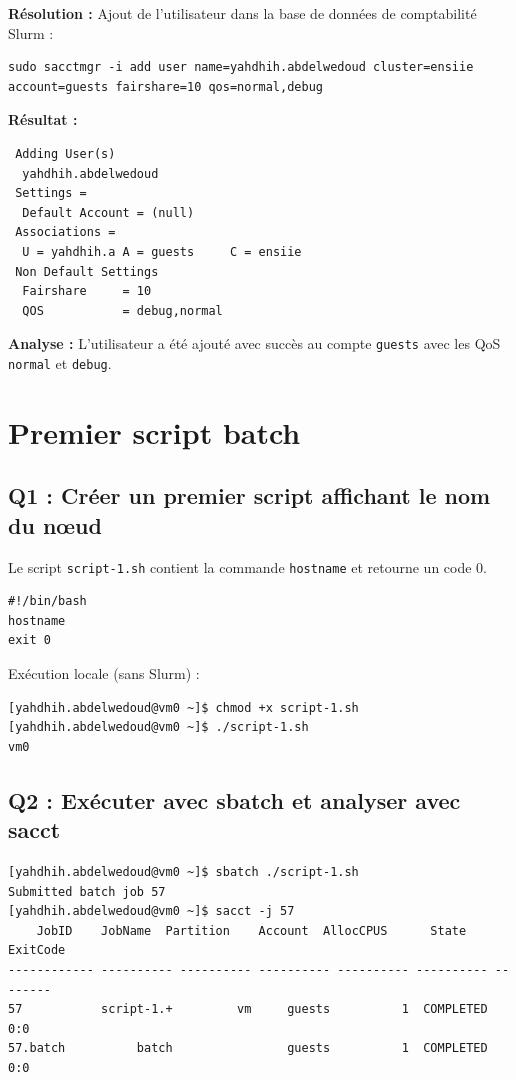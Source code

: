 \documentclass[12pt,a4paper]{article}
\newcommand{\code}[1]{\texttt{#1}}
\begin{document}
\textbf{Résolution :} Ajout de l'utilisateur dans la base de données de comptabilité Slurm :
\begin{lstlisting}
sudo sacctmgr -i add user name=yahdhih.abdelwedoud cluster=ensiie account=guests fairshare=10 qos=normal,debug
\end{lstlisting}

\textbf{Résultat :}
\begin{lstlisting}
 Adding User(s)
  yahdhih.abdelwedoud
 Settings =
  Default Account = (null)
 Associations =
  U = yahdhih.a A = guests     C = ensiie
 Non Default Settings
  Fairshare     = 10
  QOS           = debug,normal
\end{lstlisting}

\textbf{Analyse :} L'utilisateur a été ajouté avec succès au compte \code{guests} avec les QoS \code{normal} et \code{debug}.

\section{Premier script batch}

\subsection{Q1 : Créer un premier script affichant le nom du nœud}

Le script \code{script-1.sh} contient la commande \code{hostname} et retourne un code 0.

\begin{lstlisting}
#!/bin/bash
hostname
exit 0
\end{lstlisting}

Exécution locale (sans Slurm) :
\begin{lstlisting}
[yahdhih.abdelwedoud@vm0 ~]$ chmod +x script-1.sh
[yahdhih.abdelwedoud@vm0 ~]$ ./script-1.sh
vm0
\end{lstlisting}

\subsection{Q2 : Exécuter avec sbatch et analyser avec sacct}

\begin{lstlisting}
[yahdhih.abdelwedoud@vm0 ~]$ sbatch ./script-1.sh
Submitted batch job 57
[yahdhih.abdelwedoud@vm0 ~]$ sacct -j 57
    JobID    JobName  Partition    Account  AllocCPUS      State ExitCode
------------ ---------- ---------- ---------- ---------- ---------- --------
57           script-1.+         vm     guests          1  COMPLETED      0:0
57.batch          batch                guests          1  COMPLETED      0:0
\end{lstlisting}
\end{document}
